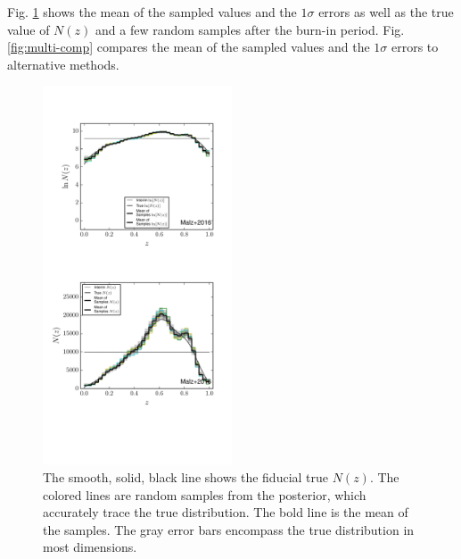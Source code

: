 \documentclass[preprint]{aastex}
\begin{document}
Fig. \ref{fig:multi-samp} shows the mean of the sampled values and the 
$1\sigma$ errors as well as the true value of $N(z)$ and a few random samples 
after the burn-in period.  Fig. \ref{fig:multi-comp} compares the mean of the 
sampled values and the $1\sigma$ errors to alternative methods.

\begin{figure}
\includegraphics[width=0.5\textwidth]{figs/mult/samps.pdf}
\caption{The smooth, solid, black line shows the fiducial true $N(z)$.  The 
colored lines are random samples from the posterior, which accurately trace the 
true distribution.  The bold line is the mean of the samples.  The gray error 
bars encompass the true distribution in most dimensions.}
\label{fig:multi-samp}
\end{figure}
\end{document}
